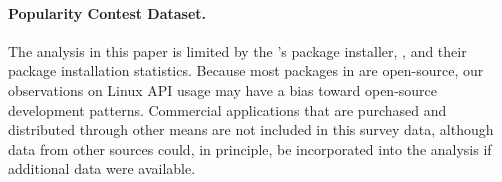 





\label{sec:metric:limitations}


\paragraph{Popularity Contest Dataset.}
The analysis in this paper is limited
by the \osdist{}'s package installer, \osinstaller{},
and their package installation statistics.
Because most packages in \osdist{} are open-source,
our observations on Linux API usage may have a bias toward open-source development patterns.
Commercial applications that are purchased and distributed
through other means are not included in this survey data,
although data from other sources could, in principle, be incorporated
into the analysis if additional data were available.

